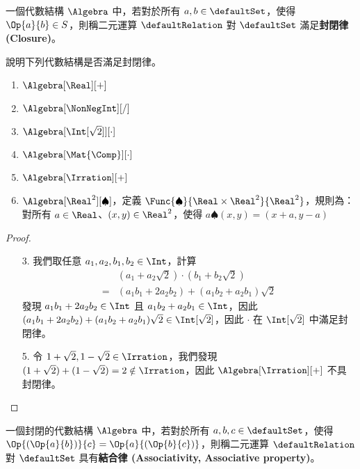 \documentclass[12pt,a4paper,oneside]{report}
\begin{document}
\begin{CJK}{UTF8}{bkai}
\begin{mydef}[封閉律]
\label{def:algebra:closure}
一個代數結構 $\Algebra$ 中，若對於所有 $a,b\in{\defaultSet}$，使得 $\Op{a}{b}\in{S}$，則稱二元運算 $\defaultRelation$ 對 $\defaultSet$ 滿足\textbf{封閉律 (Closure)}。
\end{mydef}
\begin{myexample}
說明下列代數結構是否滿足封閉律。
\begin{enumerate}
\item $\Algebra[\Real][+]$
\item $\Algebra[\NonNegInt][/]$
\item $\Algebra[{\Int[\sqrt{2}]}][\cdot]$
\item $\Algebra[\Mat{\Comp}][\cdot]$
\item $\Algebra[\Irration][+]$
\item $\Algebra[\Real^2][\spadesuit]$，定義 $\Func{\spadesuit}{\Real\times{\Real^2}}{\Real^2}$，規則為：對所有 $a\in{\Real}$、${(x,y)}\in{\Real^2}$，使得 $a\spadesuit{(x,y)}=(x+a,y-a)$
\end{enumerate}
\end{myexample}
\begin{proof}
\begin{enumerate}
\item[]
\item[3.] 我們取任意 $a_1,a_2,b_1,b_2\in{\Int}$，計算
\begin{align*}
  & {({a_1+a_2\sqrt{2}})}\cdot{({b_1+b_2\sqrt{2}})}\\
= & (a_1b_1+2a_2b_2)+{(a_1b_2+a_2b_1)}\sqrt{2}
\end{align*}
發現 $a_1b_1+2a_2b_2\in{\Int}$ 且 $a_1b_2+a_2b_1\in{\Int}$，因此 $(a_1b_1+2a_2b_2)+{(a_1b_2+a_2b_1)}\sqrt{2}\in{\Int[\sqrt{2}]}$，因此 $\cdot$ 在 $\Int[\sqrt{2}]$ 中滿足封閉律。
\item[5.] 令 $1+\sqrt{2},1-\sqrt{2}\in{\Irration}$，我們發現 ${(1+\sqrt{2})}+{(1-\sqrt{2})}=2\notin{\Irration}$，因此 $\Algebra[\Irration][+]$ 不具封閉律。
\end{enumerate}
\end{proof}

\begin{mydef}[結合律]
\label{def:algebra:associativity}
一個封閉的代數結構 $\Algebra$ 中，若對於所有 $a,b,c\in{\defaultSet}$，使得 $\Op{(\Op{a}{b})}{c}=\Op{a}{(\Op{b}{c})}$，則稱二元運算 $\defaultRelation$ 對 $\defaultSet$ 具有\textbf{結合律 (Associativity, Associative property)}。
\end{mydef}


\end{CJK}
\end{document}

